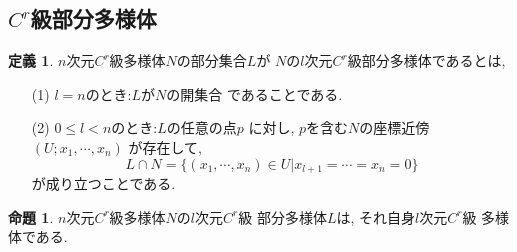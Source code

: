 \documentclass[a4j,12pt]{jarticle}
\theoremstyle{definition}
\newtheorem{definition}[theorem]{定義}
\newtheorem{proposition}[theorem]{命題}
\begin{document}
\subsection{$C^r$級部分多様体}
\begin{definition}\label{def:C^r-submanifold}
    $n$次元$C^r$級多様体$N$の部分集合$L$が
    $N$の$l$次元$C^r$級部分多様体であるとは, 
    \begin{itemize}
        \item[(1)]$l=n$のとき:$L$が$N$の開集合
        であることである. 
        \item[(2)] $0\leq l<n$のとき:$L$の任意の点$p$
        に対し, $p$を含む$N$の座標近傍$(U;x_1,\cdots ,x_n)$
        が存在して, 
        $$L\cap N=\{(x_1,\cdots ,x_n)\in U|
        x_{l+1}=\cdots =x_n=0\}$$
        が成り立つことである. 
    \end{itemize}
\end{definition}
\begin{proposition}\label{prop:dim of C^r-submanifold}
    $n$次元$C^r$級多様体$N$の$l$次元$C^r$級
    部分多様体$L$は, それ自身$l$次元$C^r$級
    多様体である. 
\end{proposition}
\end{document}
